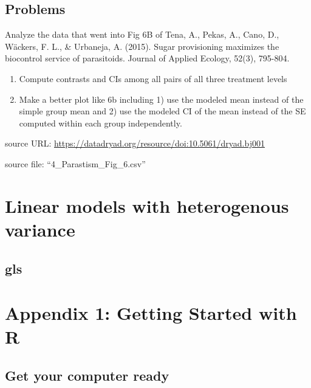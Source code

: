 \documentclass[]{book}
\providecommand{\tightlist}{%
  \setlength{\itemsep}{0pt}\setlength{\parskip}{0pt}}
\begin{document}
\hypertarget{problems-2}{%
\section{Problems}\label{problems-2}}

Analyze the data that went into Fig 6B of Tena, A., Pekas, A., Cano, D., Wäckers, F. L., \& Urbaneja, A. (2015). Sugar provisioning maximizes the biocontrol service of parasitoids. Journal of Applied Ecology, 52(3), 795-804.

\begin{enumerate}
\def\labelenumi{\arabic{enumi}.}
\tightlist
\item
  Compute contrasts and CIs among all pairs of all three treatment levels
\item
  Make a better plot like 6b including 1) use the modeled mean instead of the simple group mean and 2) use the modeled CI of the mean instead of the SE computed within each group independently.
\end{enumerate}

source URL: \url{https://datadryad.org/resource/doi:10.5061/dryad.bj001}

source file: ``4\_Parastism\_Fig\_6.csv''

\hypertarget{linear-models-with-heterogenous-variance}{%
\chapter{Linear models with heterogenous variance}\label{linear-models-with-heterogenous-variance}}

\hypertarget{gls}{%
\section{gls}\label{gls}}

\hypertarget{appendix-1-getting-started-with-r}{%
\chapter*{Appendix 1: Getting Started with R}\label{appendix-1-getting-started-with-r}}

\hypertarget{get-your-computer-ready}{%
\section{Get your computer ready}\label{get-your-computer-ready}}
\end{document}

